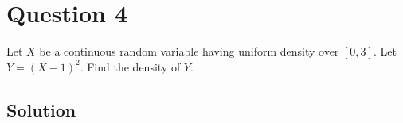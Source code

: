 \section*{Question 4}

Let \( X \) be a continuous random variable having uniform density over \( [0,3] \).
Let \( Y={(X-1)}^{2} \).
Find the density of \( Y \).

\subsection*{Solution}
